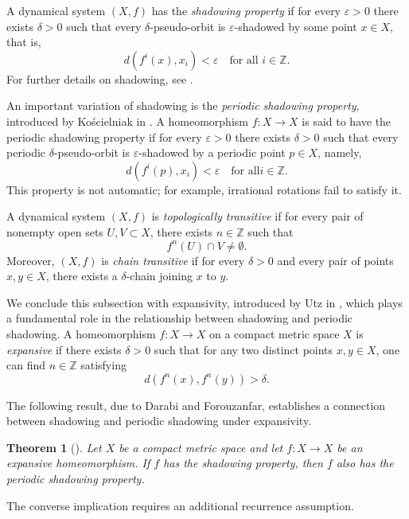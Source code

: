\documentclass{amsart}
\newtheorem{theorem}{Theorem}[section]
\theoremstyle{definition}
\begin{document}
A dynamical system $(X,f)$ has the \emph{shadowing property} if for every $\varepsilon>0$ there exists $\delta>0$ such that every $\delta$-pseudo-orbit is $\varepsilon$-shadowed by some point $x\in X$, that is,
\[
d(f^i(x),x_i)<\varepsilon
\quad \text{for all } i\in\mathbb{Z}.
\]
For further details on shadowing, see \cite{AokiHiraide}.

An important variation of shadowing is the \emph{periodic shadowing property}, introduced by Ko\'scielniak in \cite{Koscielniak1996}. A homeomorphism $f:X\to X$ is said to have the periodic shadowing property if for every $\varepsilon>0$ there exists $\delta>0$ such that every periodic $\delta$-pseudo-orbit is $\varepsilon$-shadowed by a periodic point $p\in X$, namely,
\[
d(f^i(p),x_i)<\varepsilon
\quad \text{for all} i\in\mathbb{Z}.
\]
This property is not automatic; for example, irrational rotations fail to satisfy it.

A dynamical system $(X,f)$ is \emph{topologically transitive} if for every pair of nonempty open sets $U,V\subset X$, there exists $n\in\mathbb{Z}$ such that
\[
f^n(U)\cap V\neq\emptyset.
\]
Moreover, $(X,f)$ is \emph{chain transitive} if for every $\delta>0$ and every pair of points $x,y\in X$, there exists a $\delta$-chain joining $x$ to $y$.

We conclude this subsection with expansivity, introduced by Utz in \cite{Utz}, which plays a fundamental role in the relationship between shadowing and periodic shadowing. A homeomorphism $f:X\to X$ on a compact metric space $X$ is \emph{expansive} if there exists $\delta>0$ such that for any two distinct points $x,y\in X$, one can find $n\in\mathbb{Z}$ satisfying
\[
d(f^n(x),f^n(y))>\delta.
\]

The following result, due to Darabi and Forouzanfar, establishes a connection between shadowing and periodic shadowing under expansivity.

\begin{theorem}[\cite{DarabiForouzanfar2017}]
\label{DTheA}
Let $X$ be a compact metric space and let $f:X\to X$ be an expansive homeomorphism. If $f$ has the shadowing property, then $f$ also has the periodic shadowing property.
\end{theorem}


The converse implication requires an additional recurrence assumption.
\end{document}
